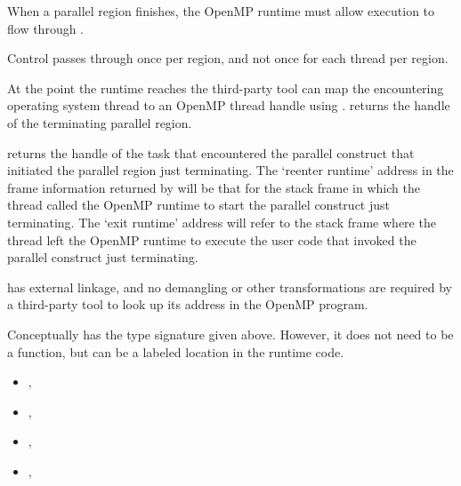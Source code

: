 \descr

When a parallel region finishes, the OpenMP runtime must allow execution
to flow through .

Control passes through 
once per region, and not once for each thread per region.

At the point the runtime reaches 
the third-party tool can map the encountering operating system thread
to an OpenMP thread handle using .
returns the handle of the terminating parallel region.

returns the handle of the task that encountered the
parallel construct that initiated the parallel region just
terminating.
The `reenter runtime' address in the frame information returned by
will be that for the stack frame in which the thread called the
OpenMP runtime to start the parallel construct just terminating.
The `exit runtime' address will refer to the stack frame where the
thread left the OpenMP runtime to execute the user code that
invoked the parallel construct just terminating.

\restrictions

 has external  linkage, and no
demangling or other transformations are required by a third-party tool
to look up its address in the OpenMP program.

Conceptually  has the type signature
given above.
However, it does not need to be a function, but can be a labeled location
in the runtime code.

\crossreferences
\begin{itemize}
\item
  , 
\item
  , 
\item
  , 
\item
  , 
\end{itemize}


\label{sec:ompd:ompd_bp_task_begin}

